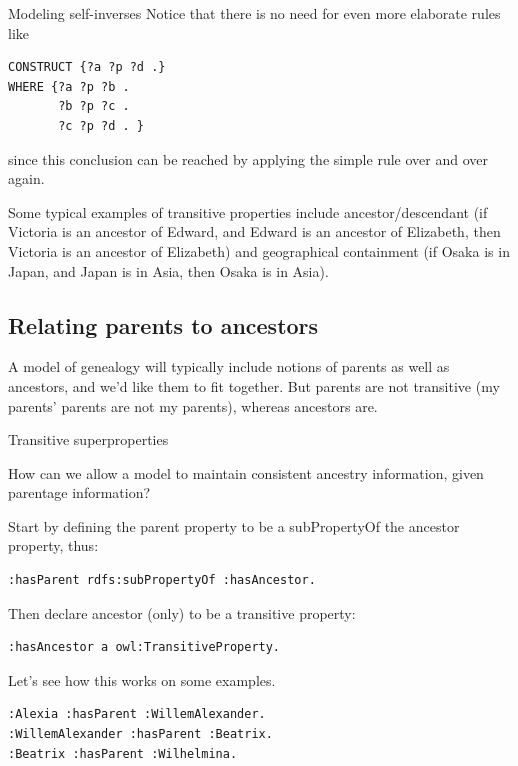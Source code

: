 \begin{challenge}{Modeling self-inverses}
Notice that there is no need for even more elaborate rules like

\begin{lstlisting}
CONSTRUCT {?a ?p ?d .}
WHERE {?a ?p ?b .
       ?b ?p ?c .
       ?c ?p ?d . }
\end{lstlisting}

since this conclusion can be reached by applying the simple rule over
and over again.

Some typical examples of transitive properties include
ancestor/descendant (if Victoria is an ancestor of Edward, and Edward is
an ancestor of Elizabeth, then Victoria is an ancestor of Elizabeth) and
geographical containment (if Osaka is in Japan, and Japan is in Asia,
then Osaka is in Asia).

\subsection{Relating parents to ancestors}

A model of genealogy will typically include notions of parents as well
as ancestors, and we'd like them to fit together. But parents are not
transitive (my parents' parents are not my parents), whereas ancestors
are.

\begin{challenge}{Transitive superproperties}
\label{chal:17}

How can we allow a model to maintain consistent ancestry information,
given parentage information?

\solution

Start by defining the parent property to be a subPropertyOf the ancestor
property, thus:

\begin{lstlisting}
:hasParent rdfs:subPropertyOf :hasAncestor.
\end{lstlisting}

Then declare ancestor (only) to be a transitive property:

\begin{lstlisting}
:hasAncestor a owl:TransitiveProperty.
\end{lstlisting}

Let's see how this works on some examples.

\begin{lstlisting}
:Alexia :hasParent :WillemAlexander.
:WillemAlexander :hasParent :Beatrix.
:Beatrix :hasParent :Wilhelmina.
\end{lstlisting}


\end{challenge}
\end{challenge}
